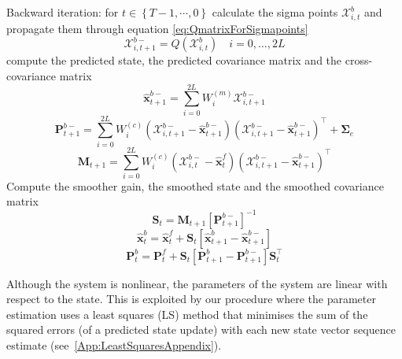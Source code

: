 \documentclass[twocolumn,11pt,a4paper]{article}		%
\begin{document}
\begin{algorithm}
\begin{small}
\begin{algorithmic}[1]
		\State Backward iteration: for $t \in \left\lbrace T-1, \cdots, 0 \right\rbrace $ calculate the sigma points $\mathcal X_{i,t}^b$ and propagate them through equation \ref{eq:QmatrixForSigmapoints}
		\begin{equation*}
			\mathcal X_{i,t+1}^{b-}=Q(\mathcal X_{i,t}^b) \quad i=0, \dots, 2L
		\end{equation*}
		 compute the predicted state, the predicted covariance matrix and the cross-covariance matrix
		\begin{equation*}
			\hat{\mathbf x}_{t+1}^{b-}=\sum_{i=0}^{2L} W_i^{(m)}\mathcal X_{i,t+1}^{b-} 
		\end{equation*}
		\begin{equation*}
			\mathbf P_{t +1}^{b-}=\sum_{i=0}^{2L} W_i^{(c)}(\mathcal X_{i,t+1}^{b-}-\hat{\mathbf x}_{t +1}^{b-})(\mathcal X_{i,t+1}^{b-}-\hat{\mathbf x}_{t +1}^{b-})^\top+\boldsymbol \Sigma_e 
		\end{equation*}
		\begin{equation*}
			\mathbf M_{t +1}=\sum_{i=0}^{2L} W_i^{(c)}(\mathcal X_{i,t}^{b-}-\hat{\mathbf x}_{t}^{f})(\mathcal X_{i,t+1}^{b-}-\hat{\mathbf x}_{t+1}^{b-})^\top 
		\end{equation*}
		 Compute the smoother gain, the smoothed state and the smoothed covariance matrix
		\begin{equation*}
			\mathbf S_t=\mathbf M_{t +1}\left[ \mathbf P_{t +1}^{b-}\right] ^{-1} 
		\end{equation*}
		\begin{equation*}
			\hat{\mathbf x}_t^b=\hat{\mathbf x}_t^f+\mathbf S_t\left[\hat{\mathbf x}_{t+1}^{b}-\hat{\mathbf x}_{t+1}^{b-}\right] 
		\end{equation*}
		\begin{equation*}
			\mathbf P_{t}^{b}=\mathbf P_{t}^{f}+\mathbf S_t\left[\mathbf P_{t+1}^{b}-\mathbf P_{t+1}^{b-} \right]\mathbf S_t^\top 
		\end{equation*}
	\end{algorithmic}
\end{small}
\end{algorithm}

Although the system is nonlinear, the parameters of the system are linear with respect to the state. This is exploited by our procedure where the parameter estimation uses a least squares (LS) method that minimises the sum of the squared errors (of a predicted state update) with each new state vector sequence estimate (see~\ref{App:LeastSquaresAppendix}).
\end{document}
